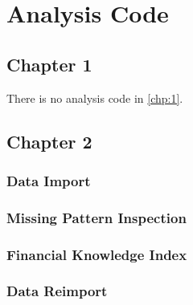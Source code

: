 \chapter{Analysis Code}

\begin{singlespace}

\section{Chapter 1}

There is no analysis code in \cref{chp:1}.

\section{Chapter 2}

\subsection{Data Import} \label{R.import} \footnotesize


\subsection{Missing Pattern Inspection} \label{R.missing} \footnotesize


\subsection{Financial Knowledge Index} \label{R.fki} \footnotesize


\subsection{Data Reimport} \label{R.reimport} \footnotesize


\end{singlespace}
